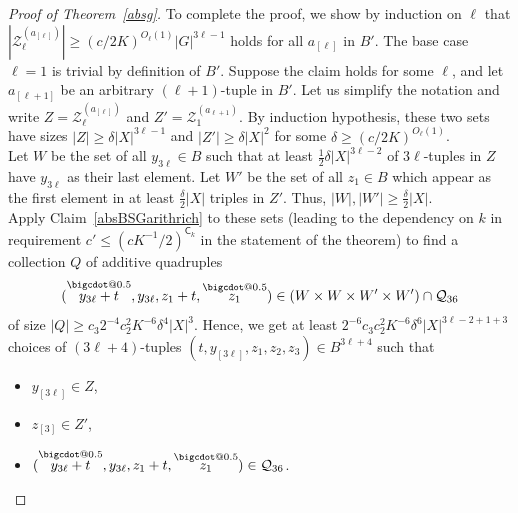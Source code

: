 \documentclass[a4paper,11pt]{article}
\makeatletter
\numberwithin{theorem}{section}
\theoremstyle{definition}
\newcommand*\bcdot{\mathpalette\bigcdot@{0.5}}
\newcommand*\bigcdot@[2]{\mathbin{\vcenter{\hbox{\scalebox{#2}{$\m@th#1\bullet$}}}}}
\newcommand{\blc}{\bm{\mathsf{C}}}
\newcommand{\upd}[1]{\overset{\bcdot}{#1}}
\makeatother
\begin{document}
\begin{proof}[Proof of Theorem~\ref{absg}]
    To complete the proof, we show by induction on $\ell$ that $|\mathcal{Z}_\ell^{(a_{[\ell]})}| \geq (c/2K)^{O_\ell(1)} |G|^{3\ell - 1}$ holds for all $a_{[\ell]}$ in $B'$. The base case $\ell = 1$ is trivial by definition of $B'$. Suppose the claim holds for some $\ell$, and let $a_{[\ell + 1]}$ be an arbitrary $(\ell+1)$-tuple in $B'$. Let us simplify the notation and write $Z =\mathcal{Z}_\ell^{(a_{[\ell]})}$ and $Z' = \mathcal{Z}_1^{(a_{\ell+1})}$. By induction hypothesis, these two sets have sizes $|Z| \geq \delta |X|^{3\ell - 1}$ and $|Z'| \geq \delta |X|^{2}$ for some $\delta \geq (c/2K)^{O_\ell(1)}$.\\
    \indent Let $W$ be the set of all $y_{3\ell} \in B$ such that at least $\frac{1}{2}\delta|X|^{3\ell-2}$ of $3\ell$-tuples in $Z$ have $y_{3\ell}$ as their last element. Let $W'$ be the set of all $z_1 \in B$ which appear as the first element in at least $\frac{\delta}{2}|X|$ triples in $Z'$. Thus, $|W|, |W'| \geq \frac{\delta}{2}|X|$.\\
    \indent Apply Claim~\ref{absBSGarithrich} to these sets (leading to the dependency on $k$ in requirement $c' \leq (cK^{-1}/2)^{\blc_k}$ in the statement of the theorem) to find a collection $Q$ of additive quadruples 
    \begin{equation}(\upd{y_{3\ell} + t}, y_{3\ell}, z_1 + t, \upd{z_1}) \in (W \times W \times W' \times W') \cap \mathcal{Q}_{36}\label{wwprimeproperty}\end{equation}
    of size $|Q| \geq c_3 2^{-4} c_2^2 K^{-6} \delta^4 |X|^3$. Hence, we get at least $2^{-6} c_3 c_2^2 K^{-6} \delta^6|X|^{3\ell - 2 + 1 + 3}$ choices of $(3\ell + 4)$-tuples $(t, y_{[3\ell]}, z_1, z_2, z_3) \in B^{3\ell + 4}$ such that 
    \begin{itemize}
        \item $y_{[3\ell]} \in Z$,
        \item $z_{[3]} \in Z'$,
        \item $(\upd{y_{3\ell} + t}, y_{3\ell}, z_1 + t, \upd{z_1}) \in \mathcal{Q}_{36}$.
    \end{itemize}


\end{proof}
\end{document}
